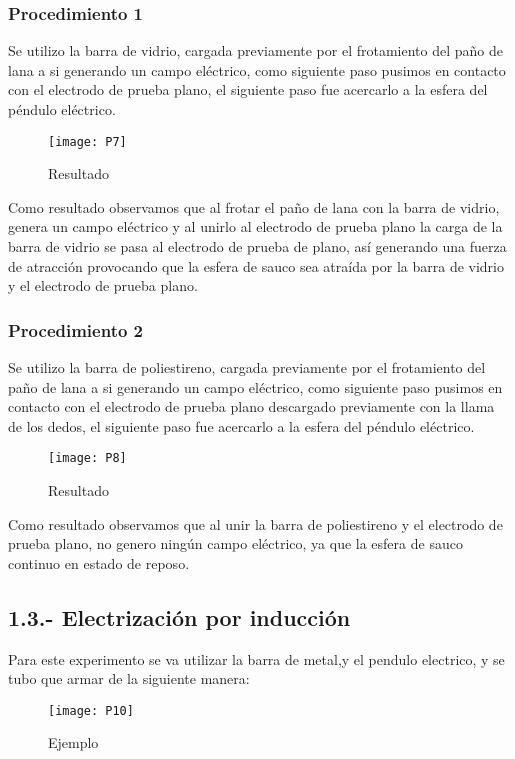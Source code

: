 \documentclass[14pt]{article}
\begin{document}
\begin{multicols}{2}
\subsubsection*{Procedimiento 1}
Se utilizo la barra de vidrio, cargada previamente por el frotamiento del paño de lana a si generando un campo eléctrico, como siguiente paso pusimos en contacto con el electrodo de prueba plano, el siguiente paso fue acercarlo a la esfera del péndulo eléctrico.

\begin{figure}[h]
\centering
\texttt{[image: P7]}
\caption{Resultado}
\end{figure}

Como resultado observamos que al frotar el paño de lana con la barra de vidrio, genera un campo eléctrico y al unirlo al electrodo de prueba plano la carga de la barra de vidrio se pasa al electrodo de prueba de plano, así generando una fuerza de atracción provocando que la esfera de sauco sea atraída por la barra de vidrio y el electrodo de prueba plano.
\subsubsection*{Procedimiento 2}
Se utilizo la barra de poliestireno, cargada previamente por el frotamiento del paño de lana a si generando un campo eléctrico, como siguiente paso pusimos en contacto con el electrodo de prueba plano descargado previamente con la llama de los dedos, el siguiente paso fue acercarlo a la esfera del péndulo eléctrico.

\begin{figure}[h]
\centering
\texttt{[image: P8]}
\caption{Resultado}
\end{figure}

Como resultado observamos que al unir la barra de poliestireno y el electrodo de prueba plano, no genero ningún campo eléctrico, ya que la esfera de sauco  continuo en estado de reposo.                                                                    

\subsection*{1.3.- Electrización por inducción}
Para este experimento se va utilizar la barra de metal,y el pendulo electrico, y se tubo que armar de la siguiente manera:


\begin{figure}[h]
\centering
\texttt{[image: P10]}
\caption{Ejemplo}
\end{figure}


\end{multicols}
\end{document}

